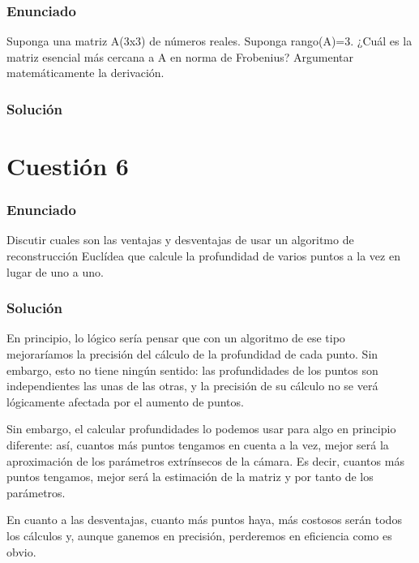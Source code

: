 \subsubsection{Enunciado}

Suponga una matriz A(3x3) de números reales. Suponga rango(A)=3. ¿Cuál es la matriz esencial más cercana a A en norma de Frobenius? Argumentar matemáticamente la derivación.

\subsubsection{Solución}




\section{Cuestión 6}

\subsubsection{Enunciado}

Discutir cuales son las ventajas y desventajas de usar un algoritmo de reconstrucción Euclídea que calcule la profundidad de varios puntos a la vez en lugar de uno a uno.

\subsubsection{Solución}


En principio, lo lógico sería pensar que con un algoritmo de ese tipo mejoraríamos la precisión del cálculo de la profundidad de cada punto. Sin embargo, esto no tiene ningún sentido: las profundidades de los puntos son independientes las unas de las otras, y la precisión de su cálculo no se verá lógicamente afectada por el aumento de puntos.

Sin embargo, el calcular profundidades lo podemos usar para algo en principio diferente: así, cuantos más puntos tengamos en cuenta a la vez, mejor será la aproximación de los parámetros extrínsecos de la cámara. Es decir, cuantos más puntos tengamos, mejor será la estimación de la matriz y por tanto de los parámetros.

En cuanto a las desventajas, cuanto más puntos haya, más costosos serán todos los cálculos y, aunque ganemos en precisión, perderemos en eficiencia como es obvio.

